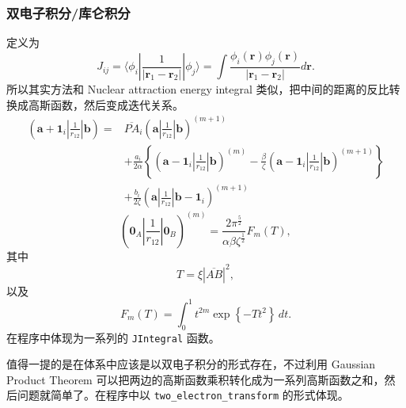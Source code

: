 \documentclass[12pt,a4paper,openany,twoside]{article}
\numberwithin{equation}{section}
\begin{document}
                \subsubsection{双电子积分/库仑积分}
            
                定义为
                \begin{equation}
                    J_{ij} = \langle \phi_i | \frac{1}{|\boldsymbol{r}_1 - \boldsymbol{r}_2|} |\phi_j \rangle = \int \frac{\phi_i(\boldsymbol{r}) \phi_j(\boldsymbol{r})}{|\boldsymbol{r}_1 - \boldsymbol{r}_2|} d \boldsymbol{r}. 
                \end{equation}
                所以其实方法和 Nuclear attraction energy integral 类似，把中间的距离的反比转换成高斯函数，然后变成迭代关系。
                \begin{equation}
                    \begin{aligned}
                    ( \boldsymbol{a} + \boldsymbol{1}_i | \frac{1}{r_{12}} | \boldsymbol{b} ) =  & \overline{PA}_i ( \boldsymbol{a} | \frac{1}{r_{12}} | \boldsymbol{b} ) ^{(m+1)} \\
                    & + \frac{a_i}{2\alpha} \left\{ ( \boldsymbol{a}-\boldsymbol{1}_i | \frac{1}{r_{12}} | \boldsymbol{b} ) ^{(m)} - \frac{\beta}{\zeta}( \boldsymbol{a} - \boldsymbol{1}_i | \frac{1}{r_{12}} | \boldsymbol{b} ) ^{(m+1)}\right\}\\
                    & + \frac{b_i}{2\zeta} ( \boldsymbol{a} | \frac{1}{r_{12}} | \boldsymbol{b} - \boldsymbol{1}_i ) ^{(m+1)} 
                    \end{aligned}
                \end{equation}
                \begin{equation}
                    ( \boldsymbol{0}_A | \frac{1}{r_{12}} | \boldsymbol{0}_B ) ^{(m)} = \frac{2\pi ^{\frac{5}{2}}}{\alpha \beta \zeta^\frac{1}{2}} F_m(T)
                ,\end{equation}
                其中
                \begin{equation}
                    T = \xi |\overline{AB}| ^2
                ,\end{equation}
                以及
                \begin{equation}
                    F_m (T) = \int ^1_0 t^{2m} \exp \left\{ - T t^2 \right\}  \, dt 
                .\end{equation}
                在程序中体现为一系列的 \lstinline$JIntegral$ 函数。

                值得一提的是在体系中应该是以双电子积分的形式存在，不过利用 Gaussian Product Theorem 可以把两边的高斯函数乘积转化成为一系列高斯函数之和，然后问题就简单了。在程序中以 \lstinline$two_electron_transform$ 的形式体现。
\end{document}
